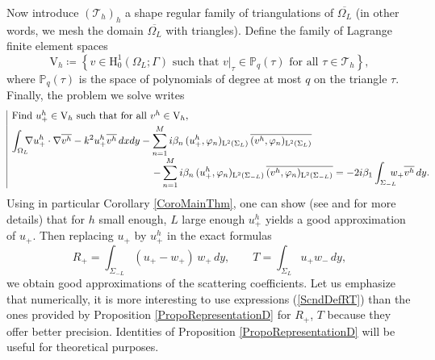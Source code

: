 \documentclass[11pt,a4paper]{report}
\newcommand{\dsp}{\displaystyle}
\newcommand{\Om}{\Omega}
\newcommand{\mrm}[1]{\mathrm{#1}}
\newcommand{\mL}{\mrm{L}}
\newcommand{\mH}{\mrm{H}}
\newcommand{\mV}{\mrm{V}}
\begin{document}
Now introduce $(\mathcal{T}_h)_h$ a shape regular family of triangulations of $\overline{\Omega_L}$ (in other words, we mesh the domain $\overline{\Omega_L}$ with triangles). Define the family of Lagrange finite element spaces
\begin{equation}\label{DefVh}
\mV_h \coloneqq \left\{v\in \mH^1_0(\Om_L;\Gamma)\mbox{ such that }v|_{\tau}\in \mathbb{P}_q(\tau)\mbox{ for all }\tau\in\mathcal{T}_h\right\},
\end{equation}
where $\mathbb{P}_q(\tau)$ is the space of polynomials of degree at most $q$ on the triangle $\tau$. Finally, the problem we solve writes
\begin{equation}\label{FormuNumD}
\begin{array}{|l}
\mbox{Find }u^h_+\in\mV_h \mbox{ such that for all }v^h\in\mV_h,\\[3pt]
\dsp\int_{\Om_L}\hspace{-0.2cm}\nabla u^h_+\cdot\nabla\overline{v^h}-k^2 u^h_+\overline{v^h}\,dxdy-
 \dsp\sum_{n=1}^{M} i\beta_n\, (u^h_+,\varphi_n)_{\mL^2(\Sigma_{ L})}\,\overline{(v^h,\varphi_n)_{\mL^2(\Sigma_{ L})}}\\[10pt]
\hspace{4.95cm}-\dsp\sum_{n=1}^{M} i\beta_n\, (u^h_+,\varphi_n)_{\mL^2(\Sigma_{ -L})}\,\overline{(v^h,\varphi_n)_{\mL^2(\Sigma_{-L})}}
=-2i\beta_1\int_{\Sigma_{-L}}\hspace{-0.3cm}w_+\overline{v^h}\,dy.
\end{array}\hspace{-0.8cm}
\end{equation} 
Using in particular Corollary \ref{CoroMainThm}, one can show (see \cite{Gold82} and \cite[Chap.\,5]{BoLu21} for more details) that for $h$ small enough, $L$ large enough  $u^h_+$ yields a good approximation of $u_+$. Then replacing $u_+$ by $u^h_+$ in the exact formulas 
\begin{equation}\label{ScndDefRT}
R_+ = \int_{\Sigma_{-L}} (u_+-w_+)\,w_+\,dy,\qquad T = \int_{\Sigma_{L}} u_+w_-\,dy,
\end{equation}
we obtain good approximations of the scattering coefficients. Let us emphasize that numerically, it is more interesting to use expressions (\ref{ScndDefRT}) than the ones provided by Proposition \ref{PropoRepresentationD} for $R_+$, $T$ because they offer better precision. Identities of Proposition \ref{PropoRepresentationD} will be useful for theoretical purposes.
\end{document}

